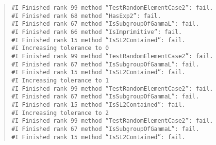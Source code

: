 \documentclass[a4paper,11pt]{article}
\theoremstyle{bla}
\begin{document}
\begin{quote}
\hspace*{-1cm} \texttt{\#I  Finished rank 99 method ``TestRandomElementCase2'': fail.}\\
\hspace*{-1cm} \texttt{\#I  Finished rank 68 method ``HasExp2'': fail.}\\
\hspace*{-1cm} \texttt{\#I  Finished rank 67 method ``IsSubgroupOfGammaL'': fail.}\\
\hspace*{-1cm} \texttt{\#I  Finished rank 66 method ``IsImprimitive'': fail.}\\
\hspace*{-1cm} \texttt{\#I  Finished rank 15 method ``IsSL2Contained'': fail.}\\
\hspace*{-1cm} \texttt{\#I  Increasing tolerance to 0}\\
\hspace*{-1cm} \texttt{\#I  Finished rank 99 method ``TestRandomElementCase2'': fail.}\\
\hspace*{-1cm} \texttt{\#I  Finished rank 67 method ``IsSubgroupOfGammaL'': fail.}\\
\hspace*{-1cm} \texttt{\#I  Finished rank 15 method ``IsSL2Contained'': fail.}\\
\hspace*{-1cm} \texttt{\#I  Increasing tolerance to 1}\\
\hspace*{-1cm} \texttt{\#I  Finished rank 99 method ``TestRandomElementCase2'': fail.}\\
\hspace*{-1cm} \texttt{\#I  Finished rank 67 method ``IsSubgroupOfGammaL'': fail.}\\
\hspace*{-1cm} \texttt{\#I  Finished rank 15 method ``IsSL2Contained'': fail.}\\
\hspace*{-1cm} \texttt{\#I  Increasing tolerance to 2}\\
\hspace*{-1cm} \texttt{\#I  Finished rank 99 method ``TestRandomElementCase2'': fail.}\\
\hspace*{-1cm} \texttt{\#I  Finished rank 67 method ``IsSubgroupOfGammaL'': fail.}\\
\hspace*{-1cm} \texttt{\#I  Finished rank 15 method ``IsSL2Contained'': fail.}\\

\end{quote}
\end{document}
